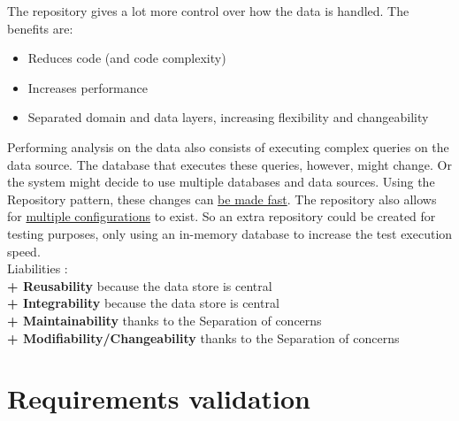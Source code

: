 The repository gives a lot more control over how the data is handled. The benefits are:
\begin{itemize}
\item Reduces code (and code complexity)
\item Increases performance
\item Separated domain and data layers, increasing flexibility and changeability
\end{itemize}

Performing analysis on the data also consists of executing complex queries on the data source. The database that executes these queries, however, might change. Or the system might decide to use multiple databases and data sources.
Using the Repository pattern, these changes can \underline{be made fast}. The repository also allows for \underline{multiple configurations} to exist. So an extra repository could be created for testing purposes, only using an in-memory database to increase the test execution speed. \\

\textit{} Liabilities : \\
\textbf{+ Reusability} because the data store is central \\
\textbf{+ Integrability} because the data store is central \\
\textbf{+ Maintainability} thanks to the Separation of concerns \\
\textbf{+ Modifiability/Changeability} thanks to the Separation of concerns\\

\section{Requirements validation}
\label{sec:req-validation}



